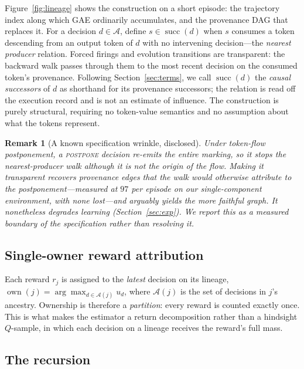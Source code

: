 \documentclass[review,authoryear,3p,times]{elsarticle}
\newtheorem{remark}{Remark}
\newcommand{\Ascr}{\mathcal{A}}
\newcommand{\suc}{\operatorname{succ}}
\newcommand{\own}{\operatorname{own}}
\begin{document}
Figure~\ref{fig:lineage} shows the construction on a short episode: the
trajectory index along which GAE ordinarily accumulates, and the provenance DAG
that replaces it. For a decision $d\in\Ascr$, define $s\in\suc(d)$ when $s$
consumes a token descending from an output token of $d$ with no intervening
decision---the \emph{nearest producer} relation. Forced firings and evolution
transitions are transparent: the backward walk passes through them to the most
recent decision on the consumed token's provenance. Following
Section~\ref{sec:terms}, we call $\suc(d)$ the \emph{causal successors} of $d$
as shorthand for its provenance successors; the relation is read off the
execution record and is not an estimate of influence. The construction is
purely structural, requiring no token-value semantics and no assumption about
what the tokens represent.

\begin{remark}[A known specification wrinkle, disclosed]
Under token-flow postponement, a \textsc{postpone} decision re-emits the entire
marking, so it stops the nearest-producer walk although it is not the origin of
the flow. Making it transparent recovers provenance edges that the walk would
otherwise attribute to the postponement---measured at $97$ per episode on our
single-component environment, with none lost---and arguably yields the more
faithful graph. It nonetheless \emph{degrades} learning
(Section~\ref{sec:exp}). We report this as a measured boundary of the
specification rather than resolving it.
\end{remark}

\subsection{Single-owner reward attribution}

Each reward $r_j$ is assigned to the \emph{latest} decision on its lineage,
$\own(j)=\arg\max_{d\in\Ascr(j)} u_d$, where $\Ascr(j)$ is the set of decisions
in $j$'s ancestry. Ownership is therefore a \emph{partition}: every reward is
counted exactly once. This is what makes the estimator a return decomposition
rather than a hindsight $Q$-sample, in which each decision on a lineage receives
the reward's full mass.

\subsection{The recursion}
\end{document}
